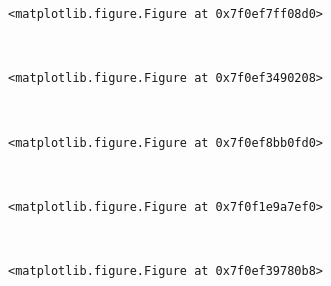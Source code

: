 \documentclass[11pt]{article}
\begin{document}
    
    \begin{verbatim}
<matplotlib.figure.Figure at 0x7f0ef7ff08d0>
    \end{verbatim}

    
    \begin{center}
    \end{center}
    { \hspace*{\fill} \\}
    
    
    \begin{verbatim}
<matplotlib.figure.Figure at 0x7f0ef3490208>
    \end{verbatim}

    
    \begin{center}
    \end{center}
    { \hspace*{\fill} \\}
    
    
    \begin{verbatim}
<matplotlib.figure.Figure at 0x7f0ef8bb0fd0>
    \end{verbatim}

    
    \begin{center}
    \end{center}
    { \hspace*{\fill} \\}
    
    
    \begin{verbatim}
<matplotlib.figure.Figure at 0x7f0f1e9a7ef0>
    \end{verbatim}

    
    \begin{center}
    \end{center}
    { \hspace*{\fill} \\}
    
    
    \begin{verbatim}
<matplotlib.figure.Figure at 0x7f0ef39780b8>
    \end{verbatim}

    
    \begin{center}
    \end{center}
    { \hspace*{\fill} \\}
    
\end{document}
